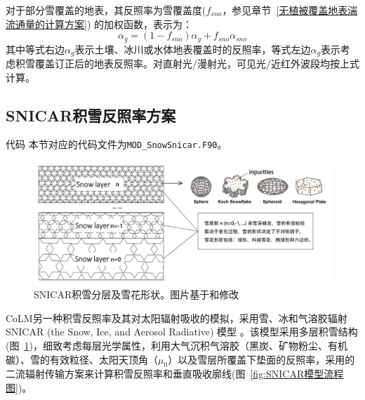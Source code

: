 对于部分雪覆盖的地表，其反照率为雪覆盖度($f_{sno}$，参见章节~\ref{无植被覆盖地表湍流通量的计算方案}) 的加权函数，表示为：
\begin{equation}
\alpha_{g}=\left(1-f_{sno}\right) \alpha_{g} + f_{sno} \alpha_{sno}
\end{equation}
其中等式右边$\alpha_{g}$表示土壤、冰川或水体地表覆盖时的反照率，等式左边$\alpha_{g}$表示考虑积雪覆盖订正后的地表反照率。对直射光/漫射光，可见光/近红外波段均按上式计算。

\subsection{SNICAR积雪反照率方案}\label{SNICAR积雪反照率}
\begin{mymdframed}{代码}
本节对应的代码文件为\texttt{MOD\_SnowSnicar.F90}。
\end{mymdframed}

{
\begin{figure}[htbp]
\centering
\includegraphics[width=0.9\columnwidth]{Figures/辐射过程及辐射通量计算/SNICAR积雪分层及雪花形状.jpg}
\caption[SNICAR积雪分层及雪花形状]{SNICAR积雪分层及雪花形状。图片基于\citet{he2017ImpactSnowGrain}和\citet{whicker2022SNICARADv4PhysicallyBased}修改}
\label{fig:SNICAR积雪分层及雪花形状}
\end{figure}
}

CoLM另一种积雪反照率及其对太阳辐射吸收的模拟，采用雪、冰和气溶胶辐射SNICAR (the Snow, Ice, and Aerosol Radiative) 模型 \citep{flanner2021SNICARADv3CommunityTool}。该模型采用多层积雪结构(图~\ref{fig:SNICAR积雪分层及雪花形状})，细致考虑每层光学属性，利用大气沉积气溶胶（黑炭、矿物粉尘、有机碳）、雪的有效粒径、太阳天顶角（\(\mu_{0}\)）以及雪层所覆盖下垫面的反照率，采用\citet{toon1989RapidCalculationRadiative}的二流辐射传输方案来计算积雪反照率和垂直吸收廓线(图~\ref{fig:SNICAR模型流程图})。

